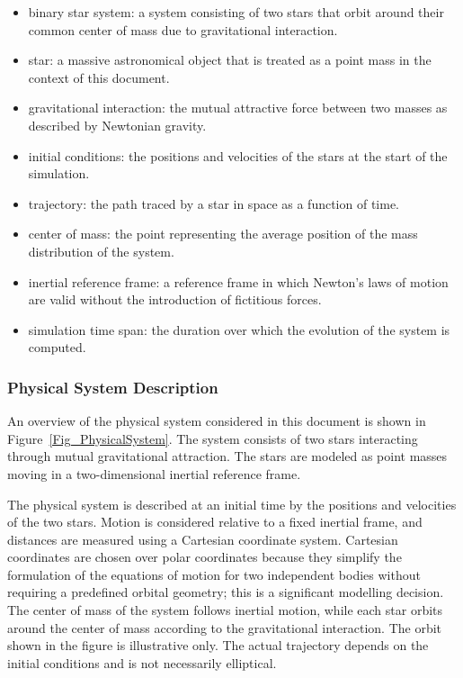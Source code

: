 \documentclass[12pt]{article}
\begin{document}
\begin{itemize}

\item binary star system: a system consisting of two stars that orbit around
their common center of mass due to gravitational interaction.

\item star: a massive astronomical object that is treated as a point mass in
the context of this document.

\item gravitational interaction: the mutual attractive force between two masses
as described by Newtonian gravity.

\item initial conditions: the positions and velocities of the stars at the
start of the simulation.

\item trajectory: the path traced by a star in space as a function of time.

\item center of mass: the point representing the average position of the mass
distribution of the system.

\item inertial reference frame: a reference frame in which Newton’s laws of
motion are valid without the introduction of fictitious forces.

\item simulation time span: the duration over which the evolution of the system
is computed.

\end{itemize}


\subsubsection{Physical System Description} \label{sec_phySystDescrip}

An overview of the physical system considered in this document is shown in
Figure~\ref{Fig_PhysicalSystem}. The system consists of two stars interacting
through mutual gravitational attraction. The stars are modeled as point masses
moving in a two-dimensional inertial reference frame.

The physical system is described at an initial time by the positions and
velocities of the two stars. Motion is considered relative to a fixed inertial
frame, and distances are measured using a Cartesian coordinate system. Cartesian
coordinates are chosen over polar coordinates because they simplify the
formulation of the equations of motion for two independent bodies without
requiring a predefined orbital geometry; this is a significant modelling
decision. The center of mass of the system follows inertial motion, while each
star orbits around the center of mass according to the gravitational
interaction. The orbit shown in the figure is illustrative only. The actual
trajectory depends on the initial conditions and is not necessarily elliptical.
\end{document}
